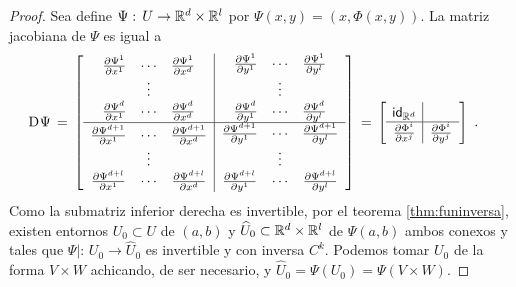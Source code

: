 \begin{proof}
	Sea define $\Psi:\,U\rightarrow\mathbb{R}^{d}\times\mathbb{R}^{l}$ por
	$\Psi(x,y)=(x,\Phi(x,y))$. La matriz jacobiana de $\Psi$ es igual a
	\begin{align*}
		\jacobiana{\Psi} & \,=\,
		\sbox0{$
		\begin{matrix}
			\derivada{\Psi^{1}}{x^{1}} & \cdots &
				\derivada{\Psi^{1}}{x^{d}} \\
			& \vdots & \\
			\derivada{\Psi^{d}}{x^{1}} & \cdots &
				\derivada{\Psi^{d}}{x^{d}}
		\end{matrix}
		$}
		\sbox1{$
		\begin{matrix}
			\derivada{\Psi^{1}}{y^{1}} & \cdots &
				\derivada{\Psi^{1}}{y^{l}} \\
			& \vdots & \\
			\derivada{\Psi^{d}}{y^{1}} & \cdots &
				\derivada{\Psi^{d}}{y^{l}}
		\end{matrix}
		$}
		\sbox2{$
		\begin{matrix}
			\derivada{\Psi^{d+1}}{x^{1}} & \cdots &
				\derivada{\Psi^{d+1}}{x^{d}} \\
			& \vdots & \\
			\derivada{\Psi^{d+l}}{x^{1}} & \cdots &
				\derivada{\Psi^{d+l}}{x^{d}}
		\end{matrix}
		$}
		\sbox3{$
		\begin{matrix}
			\derivada{\Psi^{d+1}}{y^{1}} & \cdots &
				\derivada{\Psi^{d+1}}{y^{l}} \\
			& \vdots & \\
			\derivada{\Psi^{d+l}}{y^{1}} & \cdots &
				\derivada{\Psi^{d+l}}{y^{l}}
		\end{matrix}
		$}
			\left[
			\begin{array}{c|c}
				\usebox{0} & \usebox{1} \\
			\hline
				\usebox{2} & \usebox{3}
			\end{array}
			\right]
		\,=\,
		\sbox4{$\derivada{\Phi^{i}}{x^{j}}$}
		\sbox5{$\derivada{\Phi^{i}}{y^{j}}$}
		\left[
		\begin{array}{c|c}
			\vphantom{\usebox{4}}%
				\makebox[\wd4]{$\id[\bb{R}^{d}]$} & \\
			\hline
			\usebox{4} & \usebox{5}
		\end{array}
		\right]
		\text{ .}
	\end{align*}
	Como la submatriz inferior derecha es invertible, por el teorema
	\ref{thm:funinversa}, existen entornos $U_{0}\subset U$ de $(a,b)$
	y $\widehat{U}_{0}\subset\mathbb{R}^{d}\times\mathbb{R}^{l}$ de $\Psi(a,b)$
	ambos conexos y tales que $\Psi|:\,U_{0}\rightarrow\widehat{U}_{0}$
	es invertible y con inversa $C^{k}$. Podemos tomar $U_{0}$
	de la forma $V\times W$ achicando, de ser necesario, y
	$\widehat{U}_{0}=\Psi(U_{0})=\Psi(V\times W)$.


\end{proof}
